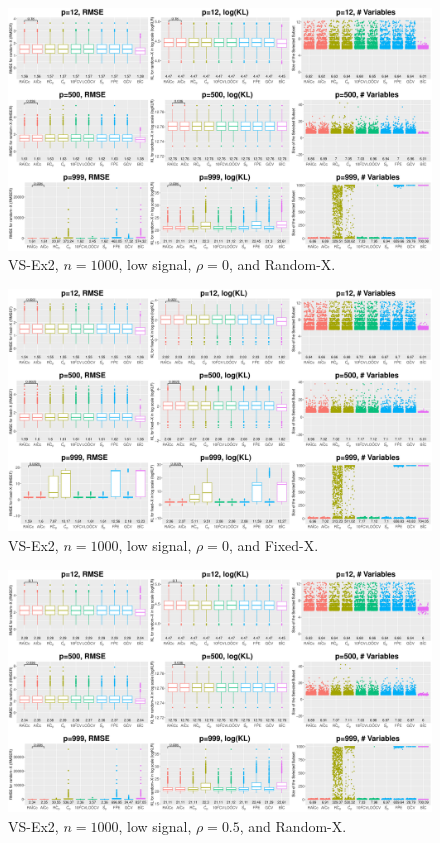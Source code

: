 \clearpage
\begin{figure}[!ht]
\centering
\includegraphics[width=\textwidth]{figures/supplement/randomx_VS-Ex2_n1000_lsnr_rho0.eps}
\caption{VS-Ex2, $n=1000$, low signal, $\rho=0$, and Random-X.}
\end{figure}
\begin{figure}[!ht]
\centering
\includegraphics[width=\textwidth]{figures/supplement/fixedx_VS-Ex2_n1000_lsnr_rho0.eps}
\caption{VS-Ex2, $n=1000$, low signal, $\rho=0$, and Fixed-X.}
\end{figure}
\clearpage
\begin{figure}[!ht]
\centering
\includegraphics[width=\textwidth]{figures/supplement/randomx_VS-Ex2_n1000_lsnr_rho05.eps}
\caption{VS-Ex2, $n=1000$, low signal, $\rho=0.5$, and Random-X.}
\end{figure}
